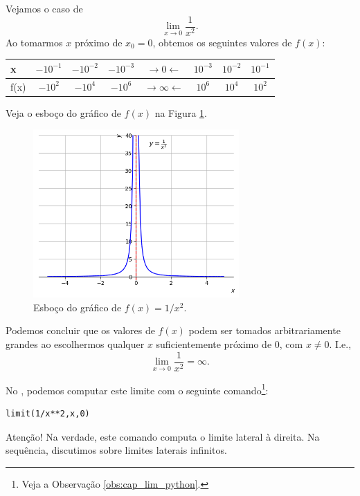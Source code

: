 \begin{ex}
  Vejamos o caso de
  \begin{equation}
    \lim_{x\to 0} \frac{1}{x^2}.
  \end{equation}
  Ao tomarmos $x$ próximo de $x_0=0$, obtemos os seguintes valores de $f(x)$:
  \begin{center}
    \begin{tabular}[H]{l|ccc|c|ccc}
      x & $-10^{-1}$ & $-10^{-2}$ & $-10^{-3}$ & $\rightarrow 0 \leftarrow$ & $10^{-3}$ & $10^{-2}$ & $10^{-1}$ \\\hline
      f(x) & $-10^{2}$ & $-10^{4}$ & $-10^{6}$ & $\rightarrow \infty \leftarrow$ & $10^{6}$ & $10^{4}$ & $10^{2}$
    \end{tabular}
  \end{center}
  Veja o esboço do gráfico de $f(x)$ na Figura \ref{fig:ex_liminf_1x2}.

\begin{figure}[H]
  \centering
  \includegraphics[width=0.7\textwidth]{./cap_lim/dados/fig_ex_liminf_1x2/fig_ex_liminf_1x2}
  \caption{Esboço do gráfico de $f(x)=1/x^2$.}
  \label{fig:ex_liminf_1x2}
\end{figure}  

  Podemos concluir que os valores de $f(x)$ podem ser tomados arbitrariamente grandes ao escolhermos qualquer $x$ suficientemente próximo de $0$, com $x\neq 0$. I.e.,
  \begin{equation}
    \lim_{x\to 0}\frac{1}{x^2} = \infty.
  \end{equation}

  \ifispython
  No \sympy, podemos computar este limite com o seguinte comando\footnote{Veja a Observação \ref{obs:cap_lim_python}.}:
\begin{verbatim}
limit(1/x**2,x,0)
\end{verbatim}
  Atenção! Na verdade, este comando computa o limite lateral à direita. Na sequência, discutimos sobre limites laterais infinitos.
  \fi
\end{ex}

